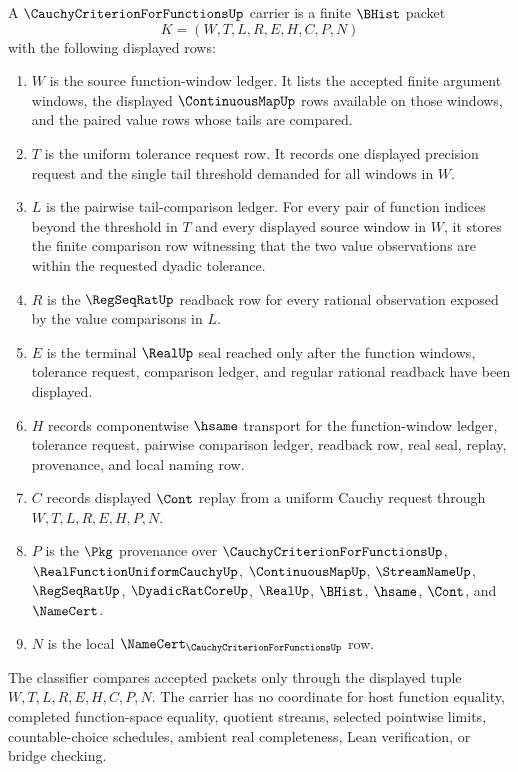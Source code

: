 \begin{definition}\label{def:cauchy-criterion-for-functions-carrier}
A $\CauchyCriterionForFunctionsUp$ carrier is a finite $\BHist$ packet
$$
K=(W,T,L,R,E,H,C,P,N)
$$
with the following displayed rows:
\begin{enumerate}
\item $W$ is the source function-window ledger. It lists the accepted finite argument windows, the displayed $\ContinuousMapUp$ rows available on those windows, and the paired value rows whose tails are compared.
\item $T$ is the uniform tolerance request row. It records one displayed precision request and the single tail threshold demanded for all windows in $W$.
\item $L$ is the pairwise tail-comparison ledger. For every pair of function indices beyond the threshold in $T$ and every displayed source window in $W$, it stores the finite comparison row witnessing that the two value observations are within the requested dyadic tolerance.
\item $R$ is the $\RegSeqRatUp$ readback row for every rational observation exposed by the value comparisons in $L$.
\item $E$ is the terminal $\RealUp$ seal reached only after the function windows, tolerance request, comparison ledger, and regular rational readback have been displayed.
\item $H$ records componentwise $\hsame$ transport for the function-window ledger, tolerance request, pairwise comparison ledger, readback row, real seal, replay, provenance, and local naming row.
\item $C$ records displayed $\Cont$ replay from a uniform Cauchy request through $W,T,L,R,E,H,P,N$.
\item $P$ is the $\Pkg$ provenance over $\CauchyCriterionForFunctionsUp$, $\RealFunctionUniformCauchyUp$, $\ContinuousMapUp$, $\StreamNameUp$, $\RegSeqRatUp$, $\DyadicRatCoreUp$, $\RealUp$, $\BHist$, $\hsame$, $\Cont$, and $\NameCert$.
\item $N$ is the local $\NameCert_{\CauchyCriterionForFunctionsUp}$ row.
\end{enumerate}
The classifier compares accepted packets only through the displayed tuple $W,T,L,R,E,H,C,P,N$. The carrier has no coordinate for host function equality, completed function-space equality, quotient streams, selected pointwise limits, countable-choice schedules, ambient real completeness, Lean verification, or bridge checking.
\end{definition}

